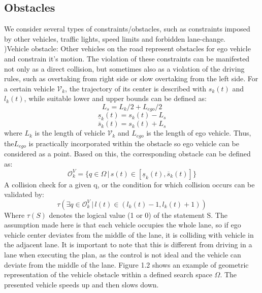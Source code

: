 \documentclass{report}
\begin{document}
 \subsection{Obstacles}
 We consider several types of constraints/obstacles, such as constraints imposed by other vehicles, traffic lights, speed limits and forbidden lane-change.\\
 )Vehicle obstacle: Other vehicles on the road represent obstacles for ego vehicle and constrain it’s motion. The violation of these constraints can be manifested not only as a direct collision, but sometimes also as a violation of the driving rules, such as overtaking from right side or slow overtaking from the left side. For a certain vehicle $\mathcal V_k$, the trajectory of its center is described with $s_k(t)$ and $l_k(t)$, while suitable lower and upper bounds can be defined as:
 \begin{equation}
 L_s = L_k / 2 + L_{ego} / 2 
 \end{equation}
 \begin{equation}
 \underline{s}_k(t) = s_k(t) - L_s
 \end{equation}
  \begin{equation}
 \overline{s}_k(t) = s_k(t) + L_s
 \end{equation}
 where $L_k$ is the length of vehicle $\mathcal V_k$ and $L_{ego}$ is the length of ego vehicle. Thus, the$L_{ego}$ is practically incorporated within the obstacle so ego vehicle can be considered as a point. Based on this, the corresponding obstacle can be defined as:
 \begin{equation}
 	\mathcal O_k^V = \{q \in \Omega \, | \, s(t) \in [\underline{s}_k(t),\overline{s}_k(t)]\}
 \end{equation}
 A collision check for a given q, or the condition for which collision occurs can be validated by:
 \begin{equation}
 	\tau (\exists q\in \mathcal O_k^V \, | \,l(t) \in (l_k(t)-1, l_k(t)+1) )
 \end{equation}
 Where $\tau(S)$ denotes the logical value (1 or 0) of the statement S. The assumption made here is that each vehicle
 occupies the whole lane, so if ego vehicle center deviates from the middle of the lane, it is colliding with vehicle in the adjacent lane. It is important to note that this is different from driving in a lane when executing the plan, as the control is not ideal and the vehicle can deviate from the middle of the lane. Figure 1.2 shows an example of geometric representation of the vehicle obstacle within a defined search space $\Omega$. The presented vehicle speeds up and then slows down.
\end{document}
